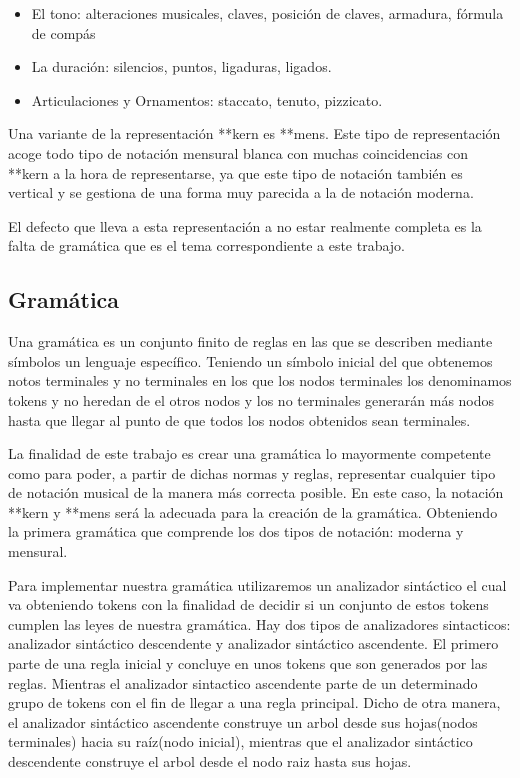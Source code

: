 \documentclass{article}
\begin{document}
    \begin{itemize}
        \item El tono: alteraciones musicales, claves, posición de claves, armadura, fórmula de compás
        \item La duración: silencios, puntos, ligaduras, ligados.
        \item Articulaciones y Ornamentos: staccato, tenuto, pizzicato.
    \end{itemize}

Una variante de la representación **kern\cite{kern} es **mens\cite{mens}. Este tipo de representación acoge todo tipo de notación mensural blanca
con muchas coincidencias con **kern a la hora de representarse, ya que este tipo de notación también es vertical y se gestiona
de una forma muy parecida a la de notación moderna.

El defecto que lleva a esta representación a no estar realmente completa es la falta de gramática que es el tema correspondiente
a este trabajo.

\subsection{Gramática}
Una gramática es un conjunto finito de reglas en las que se describen mediante símbolos un lenguaje específico. Teniendo
un símbolo inicial del que obtenemos notos terminales y no terminales en los que los nodos terminales los denominamos tokens y
no heredan de el otros nodos y los no terminales generarán más nodos hasta que llegar al punto de que todos los nodos
obtenidos sean terminales.

La finalidad de este trabajo es crear una gramática lo mayormente competente como para poder, a partir de dichas normas y reglas, representar
cualquier tipo de notación musical de la manera más correcta posible. En este caso, la notación **kern y **mens será la adecuada para la creación
de la gramática.
    Obteniendo la primera gramática que comprende los dos tipos de notación: moderna y mensural.

Para implementar nuestra gramática utilizaremos un analizador sintáctico el cual va obteniendo tokens con la finalidad de
decidir si un conjunto de estos tokens cumplen las leyes de nuestra gramática. Hay dos tipos de analizadores sintacticos:
analizador sintáctico descendente y analizador sintáctico ascendente. El primero parte de una regla inicial y concluye en unos
tokens que son generados por las reglas. Mientras el analizador sintactico ascendente parte de un determinado grupo de tokens con
el fin de llegar a una regla principal. Dicho de otra manera, el analizador sintáctico ascendente construye un
arbol desde sus hojas(nodos terminales) hacia su raíz(nodo inicial), mientras que el analizador sintáctico descendente
construye el arbol desde el nodo raiz hasta sus hojas.
\end{document}
